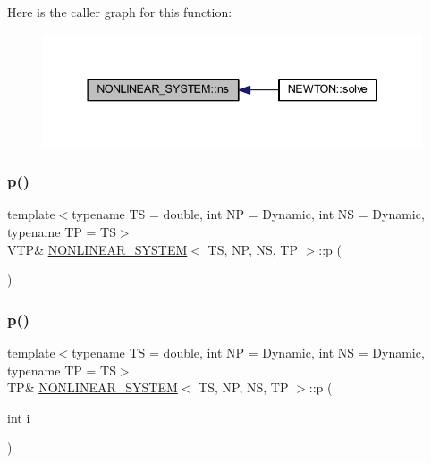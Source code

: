 Here is the caller graph for this function\+:
\nopagebreak
\begin{figure}[H]
\begin{center}
\leavevmode
\includegraphics[width=337pt]{class_n_o_n_l_i_n_e_a_r___s_y_s_t_e_m_abf4102c649f8316e44033a76f9d6183f_icgraph}
\end{center}
\end{figure}
\mbox{\label{class_n_o_n_l_i_n_e_a_r___s_y_s_t_e_m_a1536a98a6cb3fec681bdd3312ae43714}} 
\subsubsection{\texorpdfstring{p()}{p()}\hspace{0.1cm}{\footnotesize\ttfamily [1/2]}}
{\footnotesize\ttfamily template$<$typename TS = double, int NP = Dynamic, int NS = Dynamic, typename TP = TS$>$ \\
V\+TP\& \mbox{\hyperlink{class_n_o_n_l_i_n_e_a_r___s_y_s_t_e_m}{N\+O\+N\+L\+I\+N\+E\+A\+R\+\_\+\+S\+Y\+S\+T\+EM}}$<$ TS, NP, NS, TP $>$\+::p (\begin{DoxyParamCaption}{ }\end{DoxyParamCaption})\hspace{0.3cm}{\ttfamily [inline]}}

\mbox{\label{class_n_o_n_l_i_n_e_a_r___s_y_s_t_e_m_a75739c8370b0aa04f8f03e88ac19d09b}} 
\subsubsection{\texorpdfstring{p()}{p()}\hspace{0.1cm}{\footnotesize\ttfamily [2/2]}}
{\footnotesize\ttfamily template$<$typename TS = double, int NP = Dynamic, int NS = Dynamic, typename TP = TS$>$ \\
TP\& \mbox{\hyperlink{class_n_o_n_l_i_n_e_a_r___s_y_s_t_e_m}{N\+O\+N\+L\+I\+N\+E\+A\+R\+\_\+\+S\+Y\+S\+T\+EM}}$<$ TS, NP, NS, TP $>$\+::p (\begin{DoxyParamCaption}\item[{int}]{i }\end{DoxyParamCaption})\hspace{0.3cm}{\ttfamily [inline]}}

